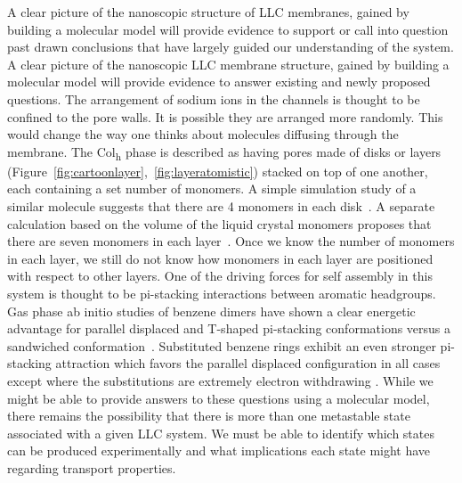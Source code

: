 A clear picture of the nanoscopic structure of LLC membranes, gained by
building a molecular model will provide evidence to support or call
into question past drawn conclusions that have largely guided our 
understanding of the system. 
A clear picture of the nanoscopic LLC membrane structure, gained by building 
a molecular model will provide evidence to answer existing and newly proposed
questions.
The arrangement of sodium ions
in the channels is thought to be confined to the pore walls. It is 
possible they are arranged more randomly. This would change the way
one thinks about molecules diffusing through the membrane. The
Col\textsubscript{h} phase is described as having pores made of disks or
layers (Figure~\ref{fig:cartoonlayer},~\ref{fig:layeratomistic}) stacked
on top of one another, each containing a set number of monomers. A 
simple simulation study of a similar molecule suggests that there are 4
monomers in each disk~\cite{zhu_methacrylated_2006}. A separate calculation
based on the volume of the liquid crystal monomers proposes that there 
are seven monomers in each layer~\cite{resel_structural_2000}. Once we %
know the number of monomers in each layer, we still do not know how 
monomers in each layer are positioned with respect to other layers. 
One of the driving forces for self %
assembly in this system is thought to be pi-stacking interactions
between aromatic headgroups\cite{gazit_possible_2002}. Gas phase ab
initio studies of benzene dimers have shown a clear energetic advantage
for parallel displaced and T-shaped pi-stacking conformations versus a
sandwiched conformation~\cite{sinnokrot_estimates_2002}.
Substituted benzene rings exhibit an even stronger pi-stacking 
attraction which favors the parallel displaced configuration in all cases
except where the substitutions are extremely electron withdrawing
\cite{waller_hybrid_2006,ringer_effect_2006}. While we might be able to
provide answers to these questions using a molecular model, there remains
the possibility that there is more than one metastable state associated
with a given LLC system. We must be able to identify which states can
be produced experimentally and what implications each state might have
regarding transport properties.

